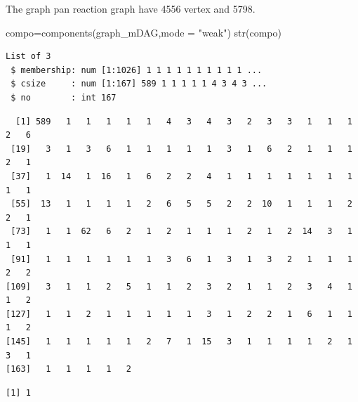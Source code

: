 \documentclass[
  letterpaper,
  DIV=11,
  numbers=noendperiod]{scrreprt}
\newenvironment{Shaded}{}{}
\newcommand{\AttributeTok}[1]{\textcolor[rgb]{0.78,0.47,0.87}{#1}}
\newcommand{\FunctionTok}[1]{\textcolor[rgb]{0.38,0.69,0.94}{#1}}
\newcommand{\NormalTok}[1]{\textcolor[rgb]{0.67,0.70,0.75}{#1}}
\newcommand{\OtherTok}[1]{\textcolor[rgb]{0.15,0.68,0.38}{#1}}
\newcommand{\SpecialCharTok}[1]{\textcolor[rgb]{0.34,0.71,0.76}{#1}}
\newcommand{\StringTok}[1]{\textcolor[rgb]{0.60,0.76,0.47}{#1}}
\begin{document}
The graph pan reaction graph have 4556 vertex and 5798.

\begin{Shaded}
\begin{Highlighting}[]
\NormalTok{compo}\OtherTok{=}\FunctionTok{components}\NormalTok{(graph\_mDAG,}\AttributeTok{mode =} \StringTok{"weak"}\NormalTok{)}
\FunctionTok{str}\NormalTok{(compo)}
\end{Highlighting}
\end{Shaded}

\begin{verbatim}
List of 3
 $ membership: num [1:1026] 1 1 1 1 1 1 1 1 1 1 ...
 $ csize     : num [1:167] 589 1 1 1 1 1 4 3 4 3 ...
 $ no        : int 167
\end{verbatim}

\begin{Shaded}
\end{Shaded}

\begin{verbatim}
  [1] 589   1   1   1   1   1   4   3   4   3   2   3   3   1   1   1   2   6
 [19]   3   1   3   6   1   1   1   1   1   3   1   6   2   1   1   1   2   1
 [37]   1  14   1  16   1   6   2   2   4   1   1   1   1   1   1   1   1   1
 [55]  13   1   1   1   1   2   6   5   5   2   2  10   1   1   1   2   2   1
 [73]   1   1  62   6   2   1   2   1   1   1   2   1   2  14   3   1   1   1
 [91]   1   1   1   1   1   1   3   6   1   3   1   3   2   1   1   1   2   2
[109]   3   1   1   2   5   1   1   2   3   2   1   1   2   3   4   1   1   2
[127]   1   1   2   1   1   1   1   1   3   1   2   2   1   6   1   1   1   2
[145]   1   1   1   1   1   2   7   1  15   3   1   1   1   1   2   1   3   1
[163]   1   1   1   1   2
\end{verbatim}

\begin{Shaded}
\end{Shaded}

\begin{verbatim}
[1] 1
\end{verbatim}
\end{document}
